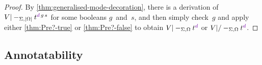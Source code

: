 \begin{proof}
By \cref{thm:generalised-mode-decoration}, there is a derivation of $V |-_{\Sigma,\erase\Omega} t^{\dir{d}\,g\,s}$ for some booleans $g$~and~$s$, and then simply check~$g$ and apply either \cref{thm:Pre?-true} or \cref{thm:Pre?-false} to obtain $V |-_{\Sigma,\Omega} t^\dir{d}$ or $V |/-_{\Sigma,\Omega} t^\dir{d}$.
\end{proof}

%
%
%
%
%

\subsection{Annotatability}
\label{sec:annotatability}

